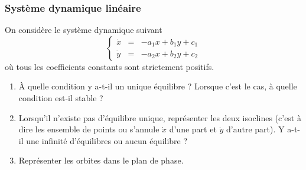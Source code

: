 \subsubsection{Système dynamique linéaire} 

On considère le système dynamique suivant
$$
\left\{\begin{array}{rcl}
        \dot x & = & -a_1 x + b_1 y + c_1 \\ 
        \dot y & = & -a_2 x + b_2 y + c_2
        \end{array}\right.
$$
où tous les coefficients constants sont strictement positifs.
\begin{enumerate}
  \item À quelle condition y a-t-il un unique équilibre ? Lorsque c’est le cas, à quelle condition est-il stable ?
  \solution{\todo{}}
  \item Lorsqu’il n’existe pas d’équilibre unique, représenter les deux isoclines (c'est à dire les ensemble de points ou s'annule $\dot x$ d'une part et $\dot y$ d'autre part). Y a-t-il une infinité d’équilibres ou aucun équilibre ?
  \solution{\todo{}}
  \item Représenter les orbites dans le plan de phase.
  \solution{\todo{}}
\end{enumerate}

